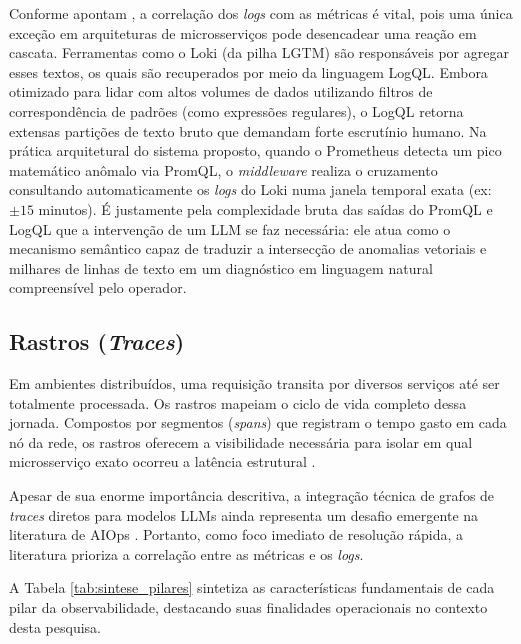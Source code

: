 Conforme apontam , a correlação dos \textit{logs} com as métricas é vital, pois uma única exceção em arquiteturas de microsserviços pode desencadear uma reação em cascata. Ferramentas como o Loki (da pilha LGTM) são responsáveis por agregar esses textos, os quais são recuperados por meio da linguagem LogQL. Embora otimizado para lidar com altos volumes de dados utilizando filtros de correspondência de padrões (como expressões regulares), o LogQL retorna extensas partições de texto bruto que demandam forte escrutínio humano. Na prática arquitetural do sistema proposto, quando o Prometheus detecta um pico matemático anômalo via PromQL, o \textit{middleware} realiza o cruzamento consultando automaticamente os \textit{logs} do Loki numa janela temporal exata (ex: $\pm 15$ minutos). É justamente pela complexidade bruta das saídas do PromQL e LogQL que a intervenção de um LLM se faz necessária: ele atua como o mecanismo semântico capaz de traduzir a intersecção de anomalias vetoriais e milhares de linhas de texto em um diagnóstico em linguagem natural compreensível pelo operador.

\subsection{Rastros (\textit{Traces})}
Em ambientes distribuídos, uma requisição transita por diversos serviços até ser totalmente processada. Os rastros mapeiam o ciclo de vida completo dessa jornada. Compostos por segmentos (\textit{spans}) que registram o tempo gasto em cada nó da rede, os rastros oferecem a visibilidade necessária para isolar em qual microsserviço exato ocorreu a latência estrutural \cite{wang_2025_integrating}.

Apesar de sua enorme importância descritiva, a integração técnica de grafos de \textit{traces} diretos para modelos LLMs ainda representa um desafio emergente na literatura de AIOps \cite{zhang2024survey}. Portanto, como foco imediato de resolução rápida, a literatura prioriza a correlação entre as métricas e os \textit{logs}.

A Tabela \ref{tab:sintese_pilares} sintetiza as características fundamentais de cada pilar da observabilidade, destacando suas finalidades operacionais no contexto desta pesquisa.


